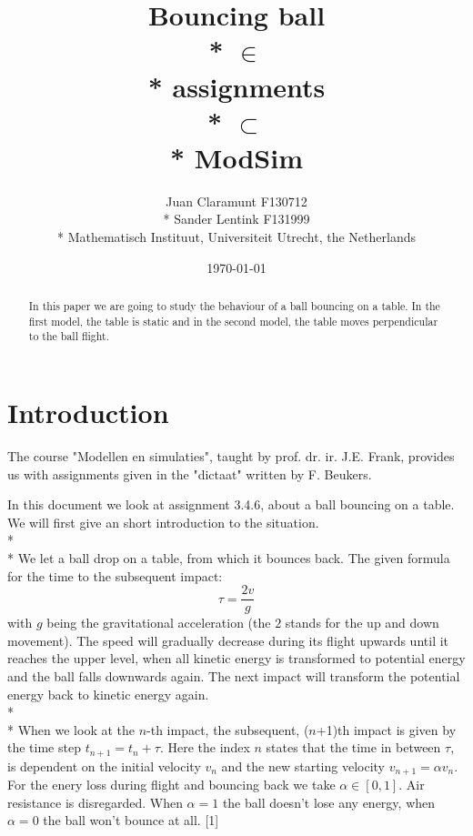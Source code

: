 \documentclass[a4paper]{article}
\begin{document}
	\title{Bouncing ball\\*
		\small
		$\in$\\*
		assignments\\*
		$\subset$\\*
		ModSim}
	\author{Juan Claramunt \small F130712\\*
    	Sander Lentink \small F131999 \\*
		\small Mathematisch Instituut, Universiteit Utrecht, the Netherlands}

	\date{\today}

\maketitle
\begin{abstract}
In this paper we are going to study the behaviour of a ball bouncing on a table. In the first model, the table is static and in the second model, the table moves perpendicular to the ball flight.
\end{abstract}



\newpage



\section{Introduction}

The course "Modellen en simulaties", taught by prof. dr. ir. J.E. Frank, provides us with assignments given in the "dictaat" written by F. Beukers.

In this document we look at assignment 3.4.6, about a ball bouncing on a table. We will first give an short introduction to the situation.
\\*
\\*
We let a ball drop on a table, from which it bounces back. The given formula for the time to the subsequent impact:
\begin{equation}
\tau=\frac{2v}{g}
\end{equation}
with $g$ being the gravitational acceleration (the $2$ stands for the up and down movement).
The speed will gradually decrease during its flight upwards until it reaches the upper level, when all kinetic energy is transformed to potential energy and the ball falls downwards again.
The next impact will transform the potential energy back to kinetic energy again.
\\*
\\*
When we look at the $n$-th impact, the subsequent,
($n$+1)th impact is given by the time step $t_{n+1} = t_n + \tau$.
Here the index $n$ states that the time in between $\tau$,
is dependent on the initial velocity $v_n$
and the new starting velocity $v_{n+1} = \alpha v_n$.
For the enery loss during flight and bouncing back we take $\alpha \in [0,1]$.
Air resistance is disregarded. When $\alpha = 1$ the ball doesn't lose any energy, when $\alpha = 0$ the ball won't bounce at all. [1]
\end{document}
